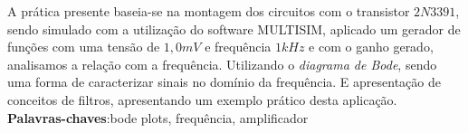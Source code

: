 \setlength{\absparsep}{18pt} %
 \begin{resumo}
A prática presente baseia-se na montagem dos circuitos com o transistor $ 2N3391 $, sendo simulado com a utilização do software MULTISIM, aplicado um gerador de funções com uma tensão de $ 1,0mV $ e frequência $ 1 kHz $ e com o ganho gerado, analisamos a relação com a frequência. Utilizando o \textit{diagrama de Bode}, sendo uma forma de caracterizar sinais no domínio da frequência. E apresentação de conceitos de filtros, apresentando um exemplo prático desta aplicação. \\
 \noindent
 \textbf{Palavras-chaves}:bode plots, frequência, amplificador
\end{resumo} 
